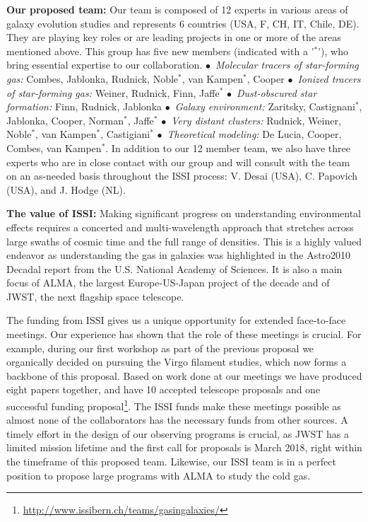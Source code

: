 \documentclass[11pt]{article}
\begin{document}
\textbf{Our proposed team:} Our team is composed of 12 experts in various areas of galaxy evolution studies and
represents 6 countries (USA, F, CH, IT, Chile, DE).  They are playing key roles or are leading
projects in one or more of the areas mentioned
above. This group has five new members (indicated with a '$^*$'), who bring essential expertise to our collaboration.  $\bullet$~\textit{Molecular tracers of star-forming gas:} Combes, Jablonka, Rudnick, Noble$^*$, van Kampen$^*$, Cooper
$\bullet$~\textit{Ionized tracers of star-forming gas:} Weiner, Rudnick, Finn, Jaffe$^*$
 $\bullet$~\textit{Dust-obscured star formation:} Finn, Rudnick, Jablonka
$\bullet$~\textit{Galaxy environment:}  Zaritsky, Castignani$^*$, Jablonka, Cooper, Norman$^*$, Jaffe$^*$ $\bullet$~\textit{Very distant clusters:} Rudnick, Weiner, Noble$^*$, van Kampen$^*$, Castigiani$^*$ $\bullet$~\textit{Theoretical modeling:} De Lucia, Cooper, Combes, van Kampen$^*$.  In addition to our 12 member team, we also have three experts who are in close contact with our group and will consult with the team on an as-needed basis throughout the ISSI process: V. Desai (USA), C. Papovich (USA), and J. Hodge (NL).

\textbf{The value of ISSI:}  
Making significant progress on understanding environmental effects requires a concerted and
multi-wavelength approach that stretches across large swaths of cosmic
time and the full range of densities.  This is a highly valued endeavor as understanding the gas in
galaxies was highlighted in the Astro2010 Decadal report from the
U.S. National Academy of Sciences.  It is also a main focus of ALMA,
the largest Europe-US-Japan project of the decade and of JWST, the next flagship space telescope.

The funding from ISSI gives us a unique opportunity for extended face-to-face meetings.  Our experience has shown that the role of these meetings is crucial.  For example, during our first workshop as part of the previous proposal we organically decided on pursuing the Virgo filament studies, which now forms a backbone of this proposal.  Based on work done at our meetings we have produced eight papers together, and have 10 accepted telescope proposals and one successful funding proposal\footnote{\url{http://www.issibern.ch/teams/gasingalaxies/}}.  The ISSI
funds make these meetings possible as almost none of the collaborators has the
necessary funds from other sources.
A timely effort in the design of our observing programs is crucial, as JWST has a limited mission lifetime and the first call for proposals is March 2018, right within the timeframe of this proposed team. Likewise, our ISSI team
is in a perfect position to propose large programs with ALMA to study the
cold gas.  
\end{document}
